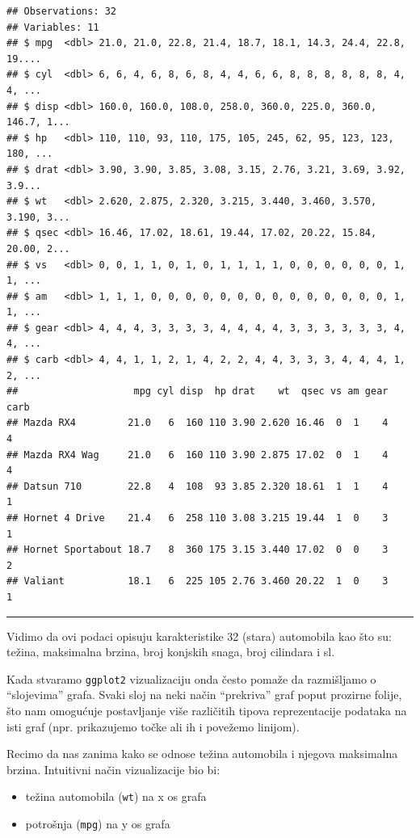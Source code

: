\documentclass[]{book}
\providecommand{\tightlist}{%
  \setlength{\itemsep}{0pt}\setlength{\parskip}{0pt}}
\theoremstyle{definition}
\theoremstyle{definition}
\theoremstyle{definition}
\theoremstyle{remark}
\begin{document}
\begin{verbatim}
## Observations: 32
## Variables: 11
## $ mpg  <dbl> 21.0, 21.0, 22.8, 21.4, 18.7, 18.1, 14.3, 24.4, 22.8, 19....
## $ cyl  <dbl> 6, 6, 4, 6, 8, 6, 8, 4, 4, 6, 6, 8, 8, 8, 8, 8, 8, 4, 4, ...
## $ disp <dbl> 160.0, 160.0, 108.0, 258.0, 360.0, 225.0, 360.0, 146.7, 1...
## $ hp   <dbl> 110, 110, 93, 110, 175, 105, 245, 62, 95, 123, 123, 180, ...
## $ drat <dbl> 3.90, 3.90, 3.85, 3.08, 3.15, 2.76, 3.21, 3.69, 3.92, 3.9...
## $ wt   <dbl> 2.620, 2.875, 2.320, 3.215, 3.440, 3.460, 3.570, 3.190, 3...
## $ qsec <dbl> 16.46, 17.02, 18.61, 19.44, 17.02, 20.22, 15.84, 20.00, 2...
## $ vs   <dbl> 0, 0, 1, 1, 0, 1, 0, 1, 1, 1, 1, 0, 0, 0, 0, 0, 0, 1, 1, ...
## $ am   <dbl> 1, 1, 1, 0, 0, 0, 0, 0, 0, 0, 0, 0, 0, 0, 0, 0, 0, 1, 1, ...
## $ gear <dbl> 4, 4, 4, 3, 3, 3, 3, 4, 4, 4, 4, 3, 3, 3, 3, 3, 3, 4, 4, ...
## $ carb <dbl> 4, 4, 1, 1, 2, 1, 4, 2, 2, 4, 4, 3, 3, 3, 4, 4, 4, 1, 2, ...
##                    mpg cyl disp  hp drat    wt  qsec vs am gear carb
## Mazda RX4         21.0   6  160 110 3.90 2.620 16.46  0  1    4    4
## Mazda RX4 Wag     21.0   6  160 110 3.90 2.875 17.02  0  1    4    4
## Datsun 710        22.8   4  108  93 3.85 2.320 18.61  1  1    4    1
## Hornet 4 Drive    21.4   6  258 110 3.08 3.215 19.44  1  0    3    1
## Hornet Sportabout 18.7   8  360 175 3.15 3.440 17.02  0  0    3    2
## Valiant           18.1   6  225 105 2.76 3.460 20.22  1  0    3    1
\end{verbatim}

\begin{center}\rule{0.5\linewidth}{\linethickness}\end{center}

Vidimo da ovi podaci opisuju karakteristike 32 (stara) automobila kao
što su: težina, maksimalna brzina, broj konjskih snaga, broj cilindara i
sl.

Kada stvaramo \texttt{ggplot2} vizualizaciju onda često pomaže da
razmišljamo o ``slojevima'' grafa. Svaki sloj na neki način ``prekriva''
graf poput prozirne folije, što nam omogućuje postavljanje više
različitih tipova reprezentacije podataka na isti graf (npr. prikazujemo
točke ali ih i povežemo linijom).

Recimo da nas zanima kako se odnose težina automobila i njegova
maksimalna brzina. Intuitivni način vizualizacije bio bi:

\begin{itemize}
\tightlist
\item
  težina automobila (\texttt{wt}) na x os grafa
\item
  potrošnja (\texttt{mpg}) na y os grafa
\end{itemize}
\end{document}
